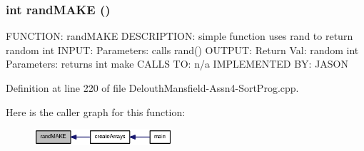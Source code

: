 \hypertarget{_delouth_mansfield-_assn4-_sort_prog_8cpp_a191743d28b671610e8d78df14b41ed9e}{
\subsubsection[{randMAKE}]{\setlength{\rightskip}{0pt plus 5cm}int randMAKE ()}}
\label{_delouth_mansfield-_assn4-_sort_prog_8cpp_a191743d28b671610e8d78df14b41ed9e}
FUNCTION: randMAKE DESCRIPTION: simple function uses rand to return random int INPUT: Parameters: calls rand() OUTPUT: Return Val: random int Parameters: returns int make CALLS TO: n/a IMPLEMENTED BY: JASON 

Definition at line 220 of file DelouthMansfield-\/Assn4-\/SortProg.cpp.



Here is the caller graph for this function:\nopagebreak
\begin{figure}[H]
\begin{center}
\leavevmode
\includegraphics[width=145pt]{_delouth_mansfield-_assn4-_sort_prog_8cpp_a191743d28b671610e8d78df14b41ed9e_icgraph}
\end{center}
\end{figure}


